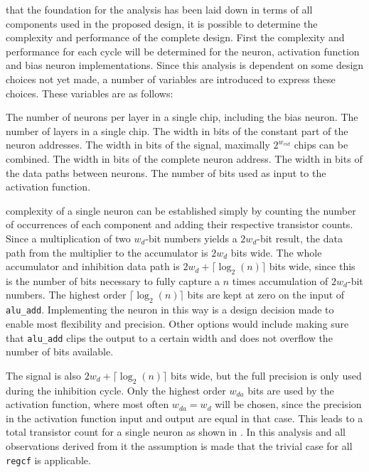 that the foundation for the analysis has been laid down in terms of all components used in the proposed design, it is possible to determine the complexity and performance of the complete design. First the complexity and performance for each cycle will be determined for the neuron, activation function and bias neuron implementations. Since this analysis is dependent on some design choices not yet made, a number of variables are introduced to express these choices. These variables are as follows:
\begin{itemize}
   The number of neurons per layer in a single chip, including the bias neuron.
   The number of layers in a single chip.
   The width in bits of the constant part of the neuron addresses.
   The width in bits of the  signal, maximally $2^{w_{cid}}$ chips can be combined.
   The width in bits of the complete neuron address.
   The width in bits of the data paths between neurons.
   The number of bits used as input to the activation function.
\end{itemize}

 complexity of a single neuron can be established simply by counting the number of occurrences of each component and adding their respective transistor counts. Since a multiplication of two $w_{d}$-bit numbers yields a $2w_{d}$-bit result, the data path from the multiplier to the accumulator is $2w_{d}$ bits wide. The whole accumulator and inhibition data path is $2w_{d} + \lceil\log_{2}(n)\rceil$ bits wide, since this is the number of bits necessary to fully capture a $n$ times accumulation of $2w_{d}$-bit numbers. The highest order $\lceil\log_{2}(n)\rceil$ bits are kept at zero on the  input of \texttt{alu\_add}. Implementing the neuron in this way is a design decision made to enable most flexibility and precision. Other options would include making sure that \texttt{alu\_add} clips the output to a certain width and does not overflow the number of bits available.

The  signal is also $2w_{d} + \lceil\log_{2}(n)\rceil$ bits wide, but the full precision is only used during the inhibition cycle. Only the highest order $w_{da}$ bits are used by the activation function, where most often $w_{da} = w_{d}$ will be chosen, since the precision in the activation function input and output are equal in that case. This leads to a total transistor count for a single neuron as shown in . In this analysis and all observations derived from it the assumption is made that the trivial case for all \texttt{regcf} is applicable.


